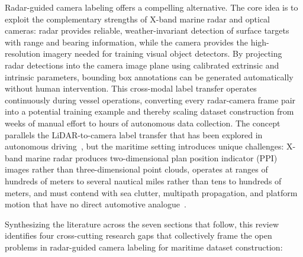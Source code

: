 Radar-guided camera labeling offers a compelling alternative. The core idea is to exploit the complementary strengths of X-band marine radar and optical cameras: radar provides reliable, weather-invariant detection of surface targets with range and bearing information, while the camera provides the high-resolution imagery needed for training visual object detectors. By projecting radar detections into the camera image plane using calibrated extrinsic and intrinsic parameters, bounding box annotations can be generated automatically without human intervention. This cross-modal label transfer operates continuously during vessel operations, converting every radar-camera frame pair into a potential training example and thereby scaling dataset construction from weeks of manual effort to hours of autonomous data collection. The concept parallels the LiDAR-to-camera label transfer that has been explored in autonomous driving~\cite{chadwick2019training,hoffmann2020warping}, but the maritime setting introduces unique challenges: X-band marine radar produces two-dimensional plan position indicator (PPI) images rather than three-dimensional point clouds, operates at ranges of hundreds of meters to several nautical miles rather than tens to hundreds of meters, and must contend with sea clutter, multipath propagation, and platform motion that have no direct automotive analogue~\cite{Ward2006,Skolnik2008}.

Synthesizing the literature across the seven sections that follow, this review identifies four cross-cutting research gaps that collectively frame the open problems in radar-guided camera labeling for maritime dataset construction:

